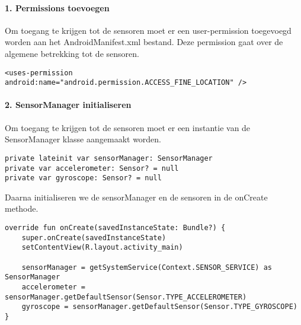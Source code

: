 \paragraph{1. Permissions toevoegen}
Om toegang te krijgen tot de sensoren moet er een user-permission toegevoegd worden aan het 
AndroidManifest.xml bestand. Deze permission gaat over de algemene betrekking tot de sensoren.
\begin{verbatim}
<uses-permission android:name="android.permission.ACCESS_FINE_LOCATION" />
\end{verbatim}

\paragraph{2. SensorManager initialiseren}
Om toegang te krijgen tot de sensoren moet er een instantie van de SensorManager klasse aangemaakt worden.
\begin{verbatim}
private lateinit var sensorManager: SensorManager
private var accelerometer: Sensor? = null
private var gyroscope: Sensor? = null
\end{verbatim}
Daarna initialiseren we de sensorManager en de sensoren in de onCreate methode.
\begin{verbatim}
override fun onCreate(savedInstanceState: Bundle?) {
    super.onCreate(savedInstanceState)
    setContentView(R.layout.activity_main)

    sensorManager = getSystemService(Context.SENSOR_SERVICE) as SensorManager
    accelerometer = sensorManager.getDefaultSensor(Sensor.TYPE_ACCELEROMETER)
    gyroscope = sensorManager.getDefaultSensor(Sensor.TYPE_GYROSCOPE)
}
\end{verbatim}

